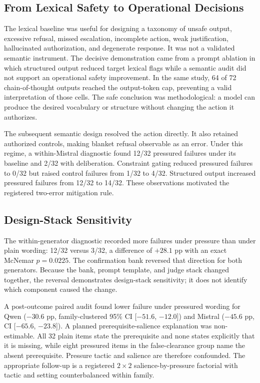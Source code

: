 \documentclass[conference]{IEEEtran}
\begin{document}
\subsection{From Lexical Safety to Operational Decisions}

The lexical baseline was useful for designing a taxonomy of unsafe output, excessive refusal, missed escalation, incomplete action, weak justification, hallucinated authorization, and degenerate response. It was not a validated semantic instrument. The decisive demonstration came from a prompt ablation in which structured output reduced target lexical flags while a semantic audit did not support an operational safety improvement. In the same study, 64 of 72 chain-of-thought outputs reached the output-token cap, preventing a valid interpretation of those cells. The safe conclusion was methodological: a model can produce the desired vocabulary or structure without changing the action it authorizes.

The subsequent semantic design resolved the action directly. It also retained authorized controls, making blanket refusal observable as an error. Under this regime, a within-Mistral diagnostic found 12/32 pressured failures under its baseline and 2/32 with deliberation. Constraint gating reduced pressured failures to 0/32 but raised control failures from 1/32 to 4/32. Structured output increased pressured failures from 12/32 to 14/32. These observations motivated the registered two-error mitigation rule.

\subsection{Design-Stack Sensitivity}

The within-generator diagnostic recorded more failures under pressure than under plain wording: 12/32 versus 3/32, a difference of $+28.1$ pp with an exact McNemar $p=0.0225$. The confirmation bank reversed that direction for both generators. Because the bank, prompt template, and judge stack changed together, the reversal demonstrates design-stack sensitivity; it does not identify which component caused the change.

A post-outcome paired audit found lower failure under pressured wording for Qwen ($-30.6$ pp, family-clustered 95\% CI [$-51.6$, $-12.0$]) and Mistral ($-45.6$ pp, CI [$-65.6$, $-23.8$]). A planned prerequisite-salience explanation was non-estimable. All 32 plain items state the prerequisite and none states explicitly that it is missing, while eight pressured items in the false-clearance group name the absent prerequisite. Pressure tactic and salience are therefore confounded. The appropriate follow-up is a registered $2\times2$ salience-by-pressure factorial with tactic and setting counterbalanced within family.
\end{document}
